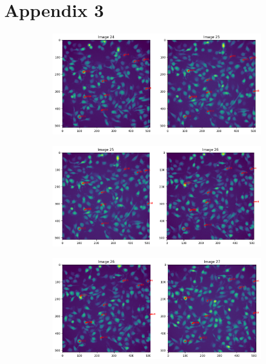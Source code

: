 \documentclass{article}
\begin{document}
\newpage
\section*{Appendix 3}

\begin{figure}[h!]
    \centering
    \begin{subfigure}[b]{0.5\linewidth}
        \centering
        \includegraphics[width=\linewidth]{Report/RImages/Traces_Growth/trace-b25.png}
        \caption{}
    \end{subfigure}%
    \begin{subfigure}[b]{0.5\linewidth}
        \centering
        \includegraphics[width=\linewidth]{Report/RImages/Traces_Growth/trace-b26.png}
        \caption{}
    \end{subfigure}
    \begin{subfigure}[b]{0.5\linewidth}
        \centering
        \includegraphics[width=\linewidth]{Report/RImages/Traces_Growth/trace-b27.png}

\end{subfigure}
\end{figure}
\end{document}
